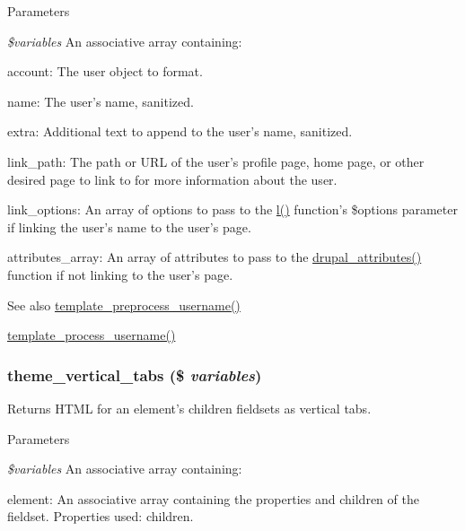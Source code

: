 \begin{DoxyParams}{Parameters}
\item[{\em \$variables}]An associative array containing:
\begin{DoxyItemize}
\item account: The user object to format.
\item name: The user's name, sanitized.
\item extra: Additional text to append to the user's name, sanitized.
\item link\_\-path: The path or URL of the user's profile page, home page, or other desired page to link to for more information about the user.
\item link\_\-options: An array of options to pass to the \hyperlink{common_8inc_ad3b36c06dc46250b8d22b8d0d2e7bd97}{l()} function's \$options parameter if linking the user's name to the user's page.
\item attributes\_\-array: An array of attributes to pass to the \hyperlink{group__sanitization_gacf11629fb3d1ebf200863e2d15380b4a}{drupal\_\-attributes()} function if not linking to the user's page.
\end{DoxyItemize}\end{DoxyParams}
\begin{DoxySeeAlso}{See also}
\hyperlink{includes_2theme_8inc_a102e6392077c4dc3810ec48fdf60fd8c}{template\_\-preprocess\_\-username()} 

\hyperlink{includes_2theme_8inc_abc04f244a6775dd537c6dd2a7397060c}{template\_\-process\_\-username()} 
\end{DoxySeeAlso}
\hypertarget{group__themeable_ga7014edeff2fd0c053bbec25fe9a4932c}{
\subsubsection[{theme\_\-vertical\_\-tabs}]{\setlength{\rightskip}{0pt plus 5cm}theme\_\-vertical\_\-tabs (\$ {\em variables})}}
\label{group__themeable_ga7014edeff2fd0c053bbec25fe9a4932c}
Returns HTML for an element's children fieldsets as vertical tabs.


\begin{DoxyParams}{Parameters}
\item[{\em \$variables}]An associative array containing:
\begin{DoxyItemize}
\item element: An associative array containing the properties and children of the fieldset. Properties used: children. 
\end{DoxyItemize}\end{DoxyParams}
